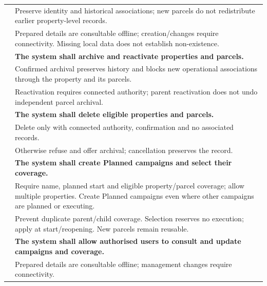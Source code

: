 {\begin{longtable}{L{0.18}L{0.82}}
\label{ac:011:a} & Preserve identity and historical associations; new parcels do not redistribute earlier property-level records.\\
\label{ac:011:b} & Prepared details are consultable offline; creation/changes require connectivity. Missing local data does not establish non-existence.\\
\midrule
{}
\label{fr:012}\textbf{} & \textbf{The system shall archive and reactivate properties and parcels.}\\*
\label{ac:012:a} & Confirmed archival preserves history and blocks new operational associations through the property and its parcels.\\
\label{ac:012:b} & Reactivation requires connected authority; parent reactivation does not undo independent parcel archival.\\
\midrule
{}
\label{fr:013}\textbf{} & \textbf{The system shall delete eligible properties and parcels.}\\*
\label{ac:013:a} & Delete only with connected authority, confirmation and no associated records.\\
\label{ac:013:b} & Otherwise refuse and offer archival; cancellation preserves the record.\\
\midrule
{}
\label{fr:014}\textbf{} & \textbf{The system shall create Planned campaigns and select their coverage.}\\*
\label{ac:014:a} & Require name, planned start and eligible property/parcel coverage; allow multiple properties. Create Planned campaigns even where other campaigns are planned or executing.\\
\label{ac:014:b} & Prevent duplicate parent/child coverage. Selection reserves no execution; apply  at start/reopening. New parcels remain reusable.\\
\midrule
{}
\label{fr:015}\textbf{} & \textbf{The system shall allow authorised users to consult and update campaigns and coverage.}\\*
\label{ac:015:a} & Prepared details are consultable offline; management changes require connectivity.\\

\end{longtable}}
